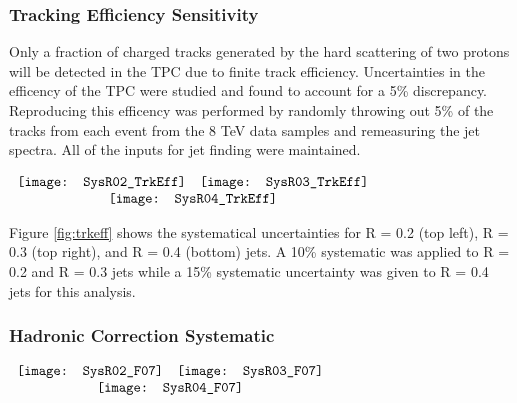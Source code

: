 \subsubsection{Tracking Efficiency Sensitivity}
Only a fraction of charged tracks generated by the hard scattering of two protons will be detected in the TPC due to finite track efficiency.  Uncertainties in the efficency of the TPC were studied and found to account for a 5\% discrepancy\cite{Abelev:2013ala}.  Reproducing this efficency was performed by randomly throwing out 5\% of the tracks from each event from the 8 TeV data samples and remeasuring the jet spectra.  All of the inputs for jet finding were maintained.


\begin{figure*}[t!]
$\begin{array}{rl}
    \texttt{[image: SysR02\_TrkEff]} &
    \texttt{[image: SysR03\_TrkEff]}\\
    \multicolumn{2}{c}{\texttt{[image: SysR04\_TrkEff]}}
\end{array}$
\caption[Systematic due to TPC tracking efficiency.]{\label{fig:trkeff}Systematic due to TPC tracking efficiency; R = 0.2 \textit{(top left)}, R = 0.3 \textit{(top right)}, R = 0.4 \textit{(bottom)}.}
\end{figure*}

\noindent
Figure \ref{fig:trkeff} shows the systematical uncertainties for R = 0.2 (top left), R = 0.3 (top right), and R = 0.4 (bottom) jets.  A 10\% systematic was applied to R = 0.2 and R = 0.3 jets while a 15\% systematic uncertainty was given to R = 0.4 jets for this analysis.

\subsubsection{Hadronic Correction Systematic}

\begin{figure*}[t!]
$\begin{array}{rl}
    \texttt{[image: SysR02\_F07]} &
    \texttt{[image: SysR03\_F07]}\\
    \multicolumn{2}{c}{\texttt{[image: SysR04\_F07]}}
\end{array}$
\caption[Systematic due to Hadronic correction.]{\label{fig:hadeff}Systematic due to hadronic correction efficiency; R = 0.2 \textit{(top left)}, R = 0.3 \textit{(top right)}, R = 0.4 \textit{(bottom)}.}
\end{figure*}

